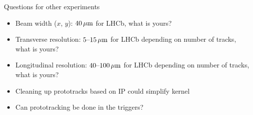 \begin{frame}{Questions for other experiments}
    \begin{itemize}
      \item
          Beam width ($x$, $y$): $\unit[40]{\mu m}$ for LHCb, what is yours?
      \item
          Transverse resolution: $\unit[5\textup{--}15]{\mu m}$ for LHCb depending on number of tracks, what is yours?
      \item
          Longitudinal resolution: $\unit[40\textup{--}100]{\mu m}$ for LHCb depending on number of tracks, what is yours?
      \item
          Cleaning up prototracks based on IP could simplify kernel
      \item
          Can prototracking be done in the triggers?
    \end{itemize}
\end{frame}
